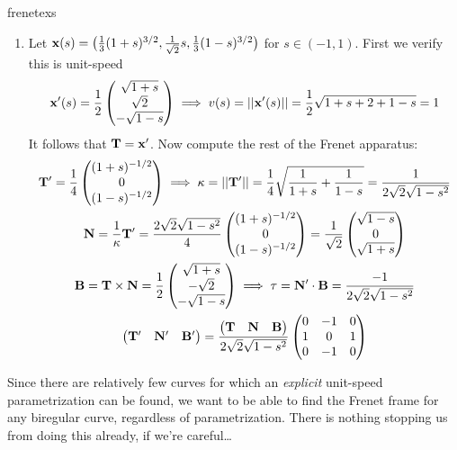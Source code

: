 \begin{examples}{}{frenetexs}
\begin{enumerate}
  \item Let ${\mathbf{x}}(s)=\bigl(\frac 13(1+s)^{3/2},\frac 1{\sqrt 2}s,\frac 13(1-s)^{3/2}\bigr)$ for $s\in(-1,1)$. First we verify this is unit-speed
	\[{\mathbf{x}}'(s)=\frac 12\begin{pmatrix}\sqrt{1+s}\\\sqrt 2\\-\sqrt{1-s}\end{pmatrix} \implies v(s)=\left| \left| {\mathbf{x}}'(s)\right|\right|=\frac 12\sqrt{1+s+2+1-s}=1\]
	It follows that ${\mathbf{T}}={\mathbf{x}}'$. Now compute the rest of the Frenet apparatus:
	\begin{gather*}
	{\mathbf{T}}'=\frac 14\begin{pmatrix}(1+s)^{-1/2}\\0\\(1-s)^{-1/2}\end{pmatrix}\implies \kappa=\left| \left| {\mathbf{T}}'\right|\right|=\frac 14\sqrt{\frac 1{1+s}+\frac 1{1-s}}=\frac 1{2\sqrt 2\sqrt{1-s^2}}\\
	{\mathbf{N}}=\frac 1{\kappa}{\mathbf{T}}' =\frac{2\sqrt 2\sqrt{1-s^2}}4\begin{pmatrix}(1+s)^{-1/2}\\0\\(1-s)^{-1/2}\end{pmatrix} =\frac 1{\sqrt 2}\begin{pmatrix}\sqrt{1-s}\\0\\\sqrt{1+s}\end{pmatrix}\\
	{\mathbf{B}}={\mathbf{T}}\times{\mathbf{N}}=\frac 12\begin{pmatrix}\sqrt{1+s}\\-\sqrt 2\\-\sqrt{1-s}\end{pmatrix}\implies \tau={\mathbf{N}}'\cdot{\mathbf{B}}=\frac{-1}{2\sqrt 2\sqrt{1-s^2}}\\
	\begin{pmatrix}
  {\mathbf{T}}'&{\mathbf{N}}'&{\mathbf{B}}'
  \end{pmatrix}=\frac{\bigl({\mathbf{T}}\ \ \ {\mathbf{N}}\ \ \ {\mathbf{B}}\bigr)}{2\sqrt 2\sqrt{1-s^2}}
  \begin{pmatrix}
		0&-1&0\\
		1&0&1\\
		0&-1&0
	\end{pmatrix}
	\end{gather*}
\end{enumerate}

\end{examples}


	

                    

Since there are relatively few curves for which an \emph{explicit} unit-speed parametrization can be found, we want to be able to find the Frenet frame for any biregular curve, regardless of parametrization. There is nothing stopping us from doing this already, if we're careful\ldots

